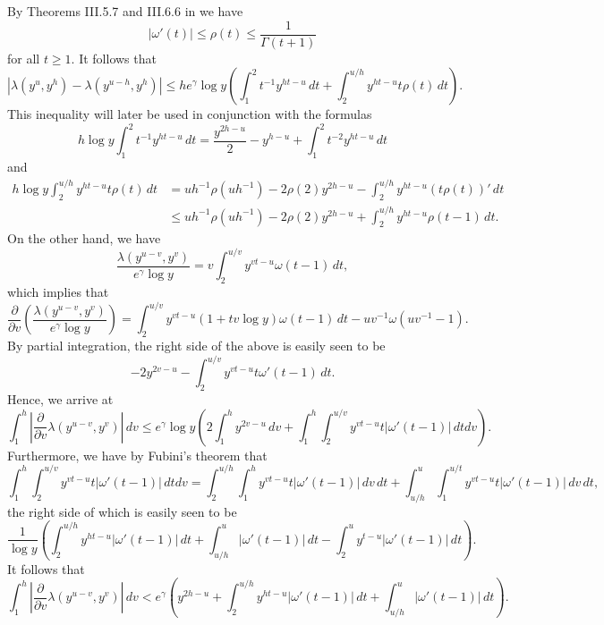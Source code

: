 \documentclass[12pt,reqno]{amsart}
\begin{document}
By Theorems III.5.7 and III.6.6 in \cite{T} we have
\begin{equation}\label{Equ:omega'}
|\omega'(t)|\le\rho(t)\le\frac{1}{\Gamma(t+1)}
\end{equation}
for all $t\ge1$. It follows that
\begin{equation}\label{Equ:lamba-lambda}
\left|\lambda(y^u,y^h)-\lambda(y^{u-h},y^h)\right|\le he^{\gamma}\log y\left(\int_{1}^{2}t^{-1}y^{ht-u}\,dt+\int_{2}^{u/h}y^{ht-u}t\rho(t)\,dt\right).
\end{equation}
This inequality will later be used in conjunction with the formulas
\begin{equation}\label{Equ:int1}
h\log y\int_{1}^{2}t^{-1}y^{ht-u}\,dt=\frac{y^{2h-u}}{2}-y^{h-u}+\int_{1}^{2}t^{-2}y^{ht-u}\,dt
\end{equation}
and 
\begin{align}
h\log y\int_{2}^{u/h}y^{ht-u}t\rho(t)\,dt&=uh^{-1}\rho(uh^{-1})-2\rho(2)y^{2h-u}-\int_{2}^{u/h}y^{ht-u}(t\rho(t))'\,dt\nonumber\\
&\le uh^{-1}\rho(uh^{-1})-2\rho(2)y^{2h-u}+\int_{2}^{u/h}y^{ht-u}\rho(t-1)\,dt.\label{Equ:int2}
\end{align}
On the other hand, we have
\[\frac{\lambda(y^{u-v},y^v)}{e^{\gamma}\log y}=v\int_{2}^{u/v}y^{vt-u}\omega(t-1)\,dt,\]
which implies that
\[\frac{\partial}{\partial v}\left(\frac{\lambda(y^{u-v},y^v)}{e^{\gamma}\log y}\right)=\int_{2}^{u/v}y^{vt-u}(1+tv\log y)\omega(t-1)\,dt-uv^{-1}\omega(uv^{-1}-1).\]
By partial integration, the right side of the above is easily seen to be
\[-2y^{2v-u}-\int_{2}^{u/v}y^{vt-u}t\omega'(t-1)\,dt.\]
Hence, we arrive at
\[\int_{1}^{h}\left|\frac{\partial}{\partial v}\lambda(y^{u-v},y^v)\right|\,dv\le e^{\gamma}\log y\left(2\int_{1}^{h}y^{2v-u}\,dv+\int_{1}^{h}\int_{2}^{u/v}y^{vt-u}t|\omega'(t-1)|\,dtdv\right).\]
Furthermore, we have by Fubini's theorem that
\[\int_{1}^{h}\int_{2}^{u/v}y^{vt-u}t|\omega'(t-1)|\,dtdv=\int_{2}^{u/h}\int_{1}^{h}y^{vt-u}t|\omega'(t-1)|\,dv\,dt+\int_{u/h}^{u}\int_{1}^{u/t}y^{vt-u}t|\omega'(t-1)|\,dv\,dt,\]
the right side of which is easily seen to be
\[\frac{1}{\log y}\left(\int_{2}^{u/h}y^{ht-u}|\omega'(t-1)|\,dt+\int_{u/h}^{u}|\omega'(t-1)|\,dt-\int_{2}^{u}y^{t-u}|\omega'(t-1)|\,dt\right).\]
It follows that
\begin{equation}\label{Equ:partiallambda}
\int_{1}^{h}\left|\frac{\partial}{\partial v}\lambda(y^{u-v},y^v)\right|\,dv< e^{\gamma}\left(y^{2h-u}+\int_{2}^{u/h}y^{ht-u}|\omega'(t-1)|\,dt+\int_{u/h}^{u}|\omega'(t-1)|\,dt\right).
\end{equation}
\end{document}

